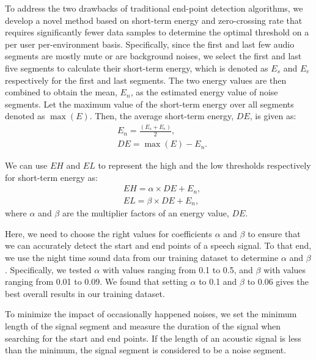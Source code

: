 To address the two drawbacks of traditional end-point detection algorithms, we develop a novel method based on short-term energy and zero-crossing rate that requires significantly fewer
data samples to determine the optimal threshold on a per user per-environment basis.
%
%
Specifically, since the first and last few audio segments are mostly mute or are background noises, we select the first and last five
segments to calculate their short-term energy, which is denoted as $E_s$ and $E_e$ respectively for the first and last segments. The two
energy values are then combined to obtain the mean, $E_n$, as the estimated energy value of noise segments. Let the maximum value of the
short-term energy over all segments denoted as $\max (E)$. Then, the average short-term energy, $DE$, is given as:
\begin{eqnarray}
      &E_n = \frac{(E_s+E_e)}{2}, \\
      &DE = \max (E)-E_n.\label{eq:DE}
\end{eqnarray}

We can use $EH$ and $EL$ to represent the high and the low thresholds respectively for short-term energy as:
\begin{eqnarray}
      &EH=\alpha \times DE+E_n,\\
      &EL=\beta \times DE+E_n,
\end{eqnarray}
where $\alpha$ and $\beta$ are the multiplier factors of an energy value, $DE$.


Here, we need to choose the right values for coefficients $\alpha$ and $\beta$ to ensure that we can accurately detect the start and end
points of a speech signal. To that end, we use the night time sound data from our training dataset to determine $\alpha$ and $\beta$.
Specifically, we tested $\alpha$ with values ranging from 0.1 to 0.5, and $\beta$ with values ranging from 0.01 to 0.09. We found that
setting $\alpha$ to  0.1 and $\beta$ to  0.06 gives the best overall results in our training dataset.

To minimize the impact of occasionally happened noises, we set the minimum length of the signal segment and measure the duration of the
signal when searching for the start and end points. If the length of an acoustic signal is less than the minimum, the signal segment is
considered to be a noise segment.

